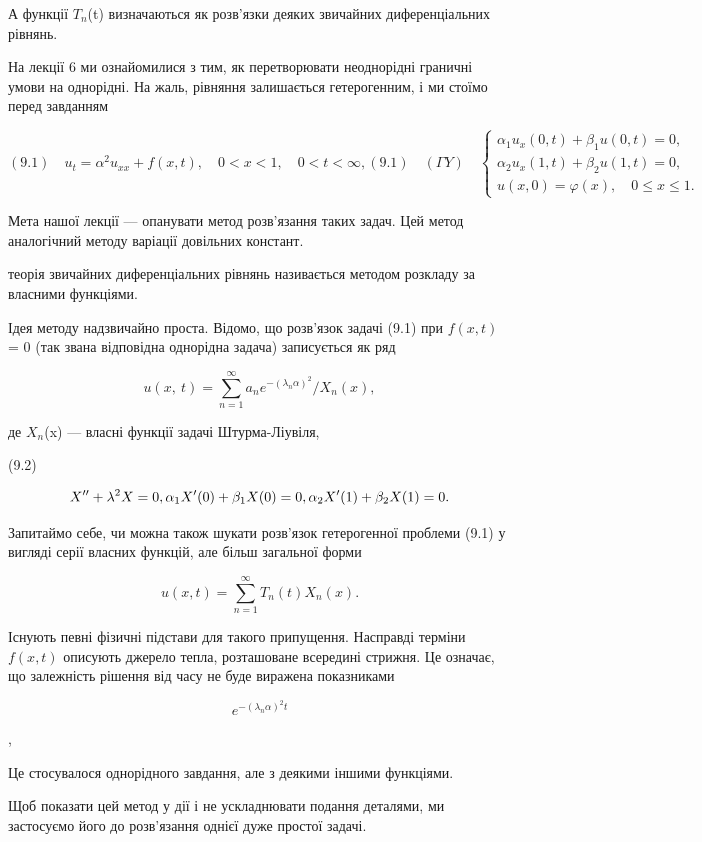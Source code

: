 \documentclass[
  ukrainian,
]{article}
\begin{document}
А функції \(T_n\)(t) визначаються як розв'язки деяких звичайних
диференціальних рівнянь.

На лекції 6 ми ознайомилися з тим, як перетворювати неоднорідні граничні
умови на однорідні. На жаль, рівняння залишається гетерогенним, і ми
стоїмо перед завданням

\[
(9.1) \quad u_{t} = \alpha^{2} u_{xx} + f(x, t), \quad 0 < x < 1, \quad 0 < t < \infty,
(9.1) \quad (\Gamma Y) \quad
\begin{cases} \alpha_{1} u_{x}(0, t) + \beta_{1} u(0, t) = 0, \\ \alpha_{2} u_{x}(1, t) + \beta_{2} u(1, t) = 0, \\ u(x, 0) = \varphi(x), \quad 0 \le x \le 1. \end{cases}
\]

Мета нашої лекції --- опанувати метод розв'язання таких задач. Цей метод
аналогічний методу варіації довільних констант.

теорія звичайних диференціальних рівнянь називається методом розкладу за
власними функціями.

Ідея методу надзвичайно проста. Відомо, що розв'язок задачі (9.1) при
\(f(x, t)\) = 0 (так звана відповідна однорідна задача) записується як
ряд

\[
u\left(x,\ t\right)=\sum_{n=1}^{\infty}a_{n}e^{-\left(\lambda_{n}\alpha\right)^{2}}/X_{n}\left(x\right),
\]

де \(X_n\)(x) --- власні функції задачі Штурма-Ліувіля,

(9.2)

\[
X'' + \lambda^2 X = 0, \\ \alpha_1 X'(0) + \beta_1 X(0) = 0, \\ \alpha_2 X'(1) + \beta_2 X(1) = 0.
\]

Запитаймо себе, чи можна також шукати розв'язок гетерогенної проблеми
(9.1) у вигляді серії власних функцій, але більш загальної форми

\[
u(x, t) = \sum_{n=1}^{\infty} T_n(t) X_n(x).
\]

Існують певні фізичні підстави для такого припущення. Насправді терміни
\(f(x,t)\) описують джерело тепла, розташоване всередині стрижня. Це
означає, що залежність рішення від часу не буде виражена показниками

\[
e^{-(\lambda_n\alpha)^2 t}
\]

,

Це стосувалося однорідного завдання, але з деякими іншими функціями.

Щоб показати цей метод у дії і не ускладнювати подання деталями, ми
застосуємо його до розв'язання однієї дуже простої задачі.
\end{document}
